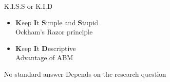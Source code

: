 \documentclass[compress]{beamer}
\begin{document}
\begin{frame}{K.I.S.S or K.I.D}
    \begin{itemize}
        \item \textcolor{myNewColorA}{\textbf{K}}eep \textcolor{myNewColorA}{\textbf{I}}t \textcolor{myNewColorA}{\textbf{S}}imple and \textcolor{myNewColorA}{\textbf{S}}tupid\\
        Ockham's Razor principle
        \item \textcolor{myNewColorA}{\textbf{K}}eep \textcolor{myNewColorA}{\textbf{I}}t \textcolor{myNewColorA}{\textbf{D}}escriptive\\
        Advantage of ABM
    \end{itemize}
    \begin{center}
        \begin{minipage}{10cm}
            \begin{block}{No standard answer}
                Depends on the research question
            \end{block}
        \end{minipage}
    \end{center}
    
\end{frame}

\begin{frame}
	\printbibliography
\end{frame}

\begin{frame}
    \titlepage
\end{frame}
\end{document}
